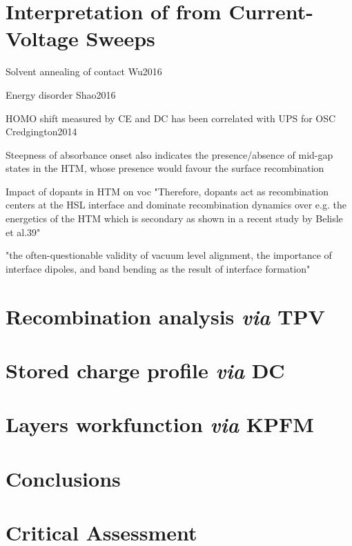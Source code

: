 


\section{Interpretation of  from Current-Voltage Sweeps}

Solvent annealing of contact Wu2016

Energy disorder Shao2016

HOMO shift measured by CE and DC has been correlated with UPS for OSC Credgington2014

Steepness of absorbance onset also indicates the presence/absence of mid-gap states in the HTM, whose presence would favour the surface recombination \cite{Tvingstedt2017}

Impact of dopants in HTM on voc \cite{Correa-Baena2017} "Therefore, dopants act as recombination centers at the HSL interface and dominate recombination dynamics over e.g. the energetics of the HTM which is secondary as shown in a recent study by Belisle et al.39"

"the often-questionable validity of vacuum level alignment, the importance of interface dipoles, and band bending as the result of interface formation" \cite{Schulz2019}


\section{Recombination analysis \textit{via} TPV}
\section{Stored charge profile \textit{via} DC}
\section{Layers workfunction \textit{via} KPFM}
\section{Conclusions}
\section{Critical Assessment}